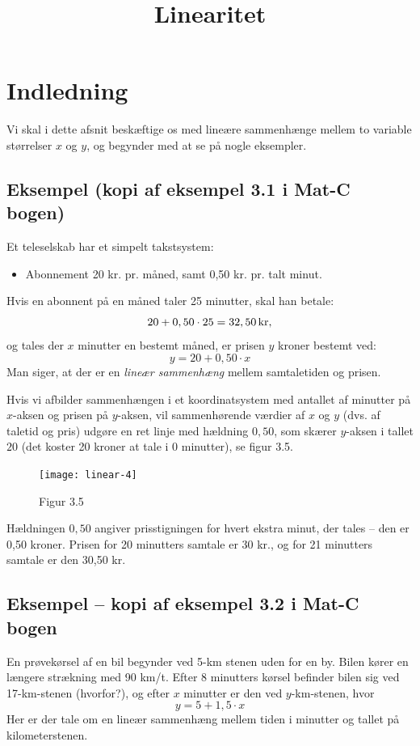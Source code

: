 \documentclass[12pt,oneside,a4paper]{article}
\title{Linearitet}
\date{\vspace{-5ex}}
\begin{document}
\maketitle

\section{Indledning}
Vi skal i dette afsnit beskæftige os med lineære sammenhænge mellem to variable
størrelser $x$ og $y$, og begynder med at se på nogle eksempler.

\subsection{Eksempel (kopi af eksempel 3.1 i Mat-C bogen)}
Et teleselskab har et simpelt takstsystem:
\begin{itemize}
    \item Abonnement 20 kr. pr. måned, samt 0,50 kr. pr. talt minut.
\end{itemize}
Hvis en abonnent på en måned taler 25 minutter, skal han betale:
$$
20 + 0,50\cdot25 = 32,50 \, {\rm kr},
$$
og tales der $x$ minutter en bestemt måned, er prisen $y$ kroner bestemt ved:
$$
y = 20 + 0,50\cdot x
$$
Man siger, at der er en {\em lineær sammenhæng} mellem samtaletiden og prisen.

Hvis vi afbilder sammenhængen i et koordinatsystem med antallet af minutter på
$x$-aksen og prisen på $y$-aksen, vil sammenhørende værdier af $x$ og $y$ (dvs.
af taletid og pris) udgøre en ret linje med hældning $0,50$, som skærer
$y$-aksen i tallet $20$ (det koster 20 kroner at tale i 0 minutter), se figur
3.5.

\begin{figure}[ht]
    \centering
    \texttt{[image: linear-4]}
    \caption{Figur 3.5}
    \label{fig35}
\end{figure}

Hældningen $0,50$ angiver prisstigningen for hvert ekstra minut, der tales --
den er 0,50 kroner.  Prisen for 20 minutters samtale er 30 kr., og for 21
minutters samtale er den 30,50 kr.

\subsection{Eksempel -- kopi af eksempel 3.2 i Mat-C bogen}
En prøvekørsel af en bil begynder ved 5-km stenen uden for en by. Bilen kører
en længere strækning med 90 km/t. Efter 8 minutters kørsel befinder bilen sig
ved 17-km-stenen (hvorfor?), og efter $x$ minutter er den ved $y$-km-stenen,
hvor
$$
y = 5 + 1,5\cdot x
$$
Her er der tale om en lineær sammenhæng mellem tiden i minutter og tallet på
kilometerstenen.
\end{document}
